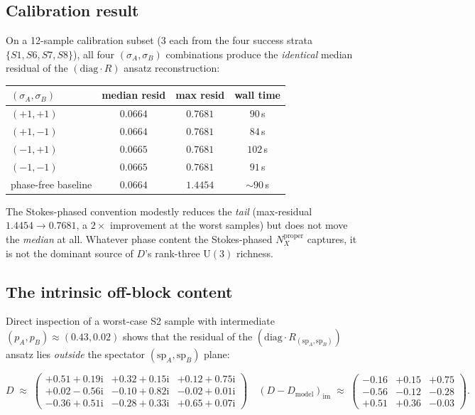 \documentclass[11pt]{article}
\newcommand{\ii}{\mathrm i}\newcommand{\dd}{\mathrm d}
\begin{document}
\subsection{Calibration result}

On a 12-sample calibration subset (3 each from the four success strata
$\{S1, S6, S7, S8\}$), all four $(\sigma_A, \sigma_B)$ combinations
produce the \emph{identical} median residual of the
$(\mathrm{diag}\cdot R)$ ansatz reconstruction:

\begin{center}\small
\begin{tabular}{lccc}
\toprule
$(\sigma_A, \sigma_B)$ & median resid & max resid & wall time \\
\midrule
$(+1, +1)$ & $0.0664$ & $0.7681$ & $90\,$s \\
$(+1, -1)$ & $0.0664$ & $0.7681$ & $84\,$s \\
$(-1, +1)$ & $0.0665$ & $0.7681$ & $102\,$s \\
$(-1, -1)$ & $0.0665$ & $0.7681$ & $91\,$s \\
\midrule
phase-free baseline & $0.0664$ & $1.4454$ & $\sim 90\,$s \\
\bottomrule
\end{tabular}
\end{center}

The Stokes-phased convention modestly reduces the \emph{tail}
(max-residual $1.4454 \to 0.7681$, a $2\times$ improvement at the
worst samples) but does not move the \emph{median} at all. Whatever
phase content the Stokes-phased $N_X^{\text{proper}}$ captures, it is
not the dominant source of $D$'s rank-three $\mathrm U(3)$ richness.

\subsection{The intrinsic off-block content}

Direct inspection of a worst-case S2 sample with intermediate
$(p_A, p_B) \approx (0.43, 0.02)$ shows that the residual of the
$(\mathrm{diag}\cdot R_{(\mathrm{sp}_A,\mathrm{sp}_B)})$ ansatz lies
\emph{outside} the spectator $(\mathrm{sp}_A, \mathrm{sp}_B)$ plane:

\[
D \;\approx\; \begin{pmatrix}
+0.51+0.19\ii & +0.32+0.15\ii & +0.12+0.75\ii \\
+0.02-0.56\ii & -0.10+0.82\ii & -0.02+0.01\ii \\
-0.36+0.51\ii & -0.28+0.33\ii & +0.65+0.07\ii
\end{pmatrix}
\quad
(D - D_{\mathrm{model}})_{\mathrm{im}} \;\approx\; \begin{pmatrix}
-0.16 & +0.15 & +0.75 \\
-0.56 & -0.12 & -0.28 \\
+0.51 & +0.36 & -0.03
\end{pmatrix}.
\]
\end{document}
